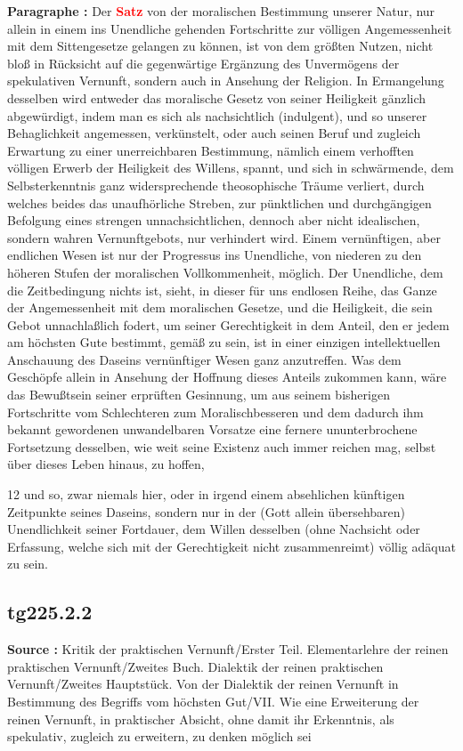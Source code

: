 \documentclass[a4paper,12pt,twoside]{book}
\newcommand{\match}[1]{\textcolor{red}{\textbf{#1}}}
\begin{document}
	\noindent\textbf{Paragraphe : }Der \match{Satz} von der moralischen Bestimmung unserer Natur, nur allein in einem ins Unendliche gehenden Fortschritte zur völligen Angemessenheit mit dem Sittengesetze gelangen zu können, ist von dem größten Nutzen, nicht bloß in Rücksicht auf die gegenwärtige Ergänzung des Unvermögens der spekulativen Vernunft, sondern auch in Ansehung der Religion. In Ermangelung desselben wird entweder das moralische Gesetz von seiner Heiligkeit gänzlich abgewürdigt, indem man es sich als nachsichtlich (indulgent), und so unserer Behaglichkeit angemessen, verkünstelt, oder auch seinen Beruf und zugleich Erwartung zu einer unerreichbaren Bestimmung, nämlich einem verhofften völligen Erwerb der Heiligkeit des Willens, spannt, und sich in schwärmende, dem Selbsterkenntnis ganz widersprechende theosophische Träume verliert, durch welches beides das unaufhörliche Streben, zur pünktlichen und durchgängigen Befolgung eines strengen unnachsichtlichen, dennoch aber nicht idealischen, sondern wahren Vernunftgebots, nur verhindert wird. Einem vernünftigen, aber endlichen Wesen ist nur der Progressus ins Unendliche, von niederen zu den höheren Stufen der moralischen Vollkommenheit, möglich. Der Unendliche, dem die Zeitbedingung nichts ist, sieht, in dieser für uns endlosen Reihe, das Ganze der Angemessenheit mit dem moralischen Gesetze, und die Heiligkeit, die sein Gebot unnachlaßlich fodert, um seiner Gerechtigkeit in dem Anteil, den er jedem am höchsten Gute bestimmt, gemäß zu sein, ist in einer einzigen intellektuellen Anschauung des Daseins vernünftiger Wesen ganz anzutreffen. Was dem Geschöpfe allein in Ansehung der Hoffnung dieses Anteils zukommen kann, wäre das Bewußtsein seiner erprüften Gesinnung, um aus seinem bisherigen Fortschritte vom Schlechteren zum Moralischbesseren und dem dadurch ihm bekannt gewordenen unwandelbaren Vorsatze eine fernere ununterbrochene Fortsetzung desselben, wie weit seine Existenz auch immer reichen mag, selbst über  dieses Leben hinaus, zu hoffen,
	
	
	12
	und so, zwar niemals hier, oder in irgend einem absehlichen künftigen Zeitpunkte seines Daseins, sondern nur in der (Gott allein übersehbaren) Unendlichkeit seiner Fortdauer, dem Willen desselben (ohne Nachsicht oder Erfassung, welche sich mit der Gerechtigkeit nicht zusammenreimt) völlig adäquat zu sein. 
	
	\subsection*{tg225.2.2} 
	\textbf{Source : }Kritik der praktischen Vernunft/Erster Teil. Elementarlehre der reinen praktischen Vernunft/Zweites Buch. Dialektik der reinen praktischen Vernunft/Zweites Hauptstück. Von der Dialektik der reinen Vernunft in Bestimmung des Begriffs vom höchsten Gut/VII. Wie eine Erweiterung der reinen Vernunft, in praktischer Absicht, ohne damit ihr Erkenntnis, als spekulativ, zugleich zu erweitern, zu denken möglich sei\\  
	
\end{document}
